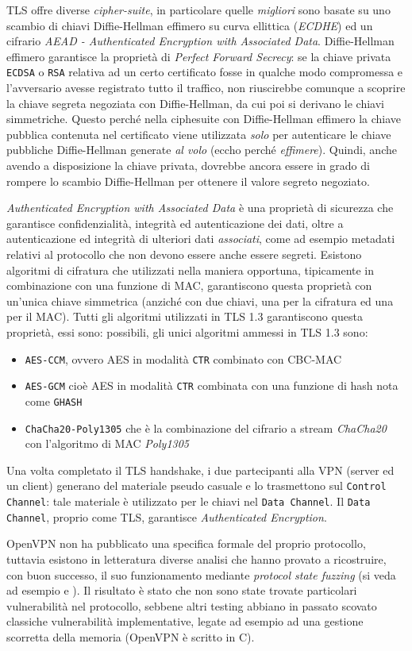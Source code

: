 TLS offre diverse \textit{cipher-suite}, in particolare quelle \textit{migliori}
sono basate su uno scambio di chiavi Diffie-Hellman effimero su curva ellittica
(\textit{ECDHE}) ed un cifrario \textit{AEAD - Authenticated Encryption with Associated Data}.
Diffie-Hellman effimero garantisce la proprietà di \textit{Perfect Forward Secrecy}: se
la chiave privata \texttt{ECDSA} o \texttt{RSA} relativa ad un certo certificato fosse in qualche modo
compromessa e l'avversario avesse registrato tutto il traffico, non riuscirebbe comunque
a scoprire la chiave segreta negoziata con Diffie-Hellman, da cui poi si derivano le
chiavi simmetriche. Questo perché nella ciphesuite con Diffie-Hellman effimero la chiave
pubblica contenuta nel certificato viene utilizzata \textit{solo} per autenticare
le chiave pubbliche Diffie-Hellman generate \textit{al volo} (eccho perché \textit{effimere}).
Quindi, anche avendo a disposizione la chiave privata, dovrebbe ancora essere in grado di
rompere lo scambio Diffie-Hellman per ottenere il valore segreto negoziato.

\textit{Authenticated Encryption with Associated Data} è una proprietà di sicurezza
che garantisce confidenzialità, integrità ed autenticazione dei dati, oltre
a autenticazione ed integrità di ulteriori dati \textit{associati}, come ad esempio
metadati relativi al protocollo che non devono essere anche essere segreti.
Esistono algoritmi di cifratura che utilizzati nella maniera opportuna, tipicamente in combinazione
con una funzione di MAC, garantiscono questa proprietà con un'unica chiave simmetrica
(anziché con due chiavi, una per la cifratura ed una per il MAC). Tutti gli algoritmi
utilizzati in TLS 1.3 garantiscono questa proprietà, essi sono:
possibili, gli unici algoritmi ammessi in TLS 1.3 sono:
\begin{itemize}
  \item \texttt{AES-CCM}, ovvero AES in modalità \texttt{CTR} combinato con CBC-MAC
  \item \texttt{AES-GCM} cioè AES in modalità \texttt{CTR} combinata con una funzione di hash nota come
  \texttt{GHASH}
  \item \texttt{ChaCha20-Poly1305} che è la combinazione del cifrario a stream \textit{ChaCha20}
  con l'algoritmo di MAC \textit{Poly1305}
\end{itemize}


Una volta completato il TLS handshake, i due partecipanti alla VPN (server ed un client)
generano del materiale pseudo casuale e lo trasmettono sul \texttt{Control Channel}: tale
materiale è utilizzato per le chiavi nel \texttt{Data Channel}. Il \texttt{Data Channel},
proprio come TLS, garantisce \textit{Authenticated Encryption}.


OpenVPN non ha pubblicato una specifica formale del proprio protocollo, tuttavia
esistono in letteratura diverse analisi che hanno provato a ricostruire, con buon
successo, il suo funzionamento mediante \textit{protocol state fuzzing} (si veda
ad esempio \cite{openvpn-fuzz-1} e \cite{openvpn-fuzz-2}). Il risultato è stato
che non sono state trovate particolari vulnerabilità nel protocollo, sebbene
altri testing abbiano in passato scovato classiche vulnerabilità implementative,
legate ad esempio ad una gestione scorretta della memoria (OpenVPN è scritto in C).
